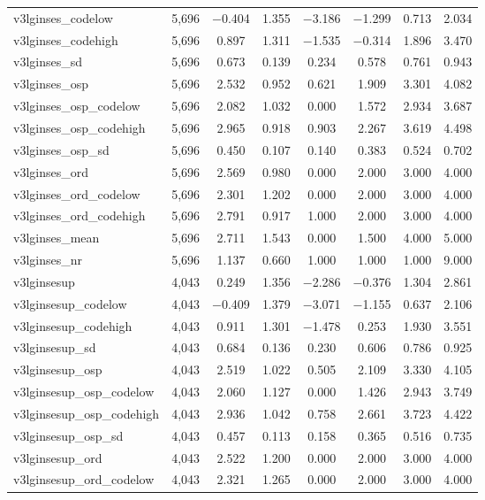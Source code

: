 \begin{table}[!htbp]
\begin{tabular}{@{\extracolsep{5pt}}lccccccc}
v3lginses\_codelow & 5,696 & $-$0.404 & 1.355 & $-$3.186 & $-$1.299 & 0.713 & 2.034 \\ 
v3lginses\_codehigh & 5,696 & 0.897 & 1.311 & $-$1.535 & $-$0.314 & 1.896 & 3.470 \\ 
v3lginses\_sd & 5,696 & 0.673 & 0.139 & 0.234 & 0.578 & 0.761 & 0.943 \\ 
v3lginses\_osp & 5,696 & 2.532 & 0.952 & 0.621 & 1.909 & 3.301 & 4.082 \\ 
v3lginses\_osp\_codelow & 5,696 & 2.082 & 1.032 & 0.000 & 1.572 & 2.934 & 3.687 \\ 
v3lginses\_osp\_codehigh & 5,696 & 2.965 & 0.918 & 0.903 & 2.267 & 3.619 & 4.498 \\ 
v3lginses\_osp\_sd & 5,696 & 0.450 & 0.107 & 0.140 & 0.383 & 0.524 & 0.702 \\ 
v3lginses\_ord & 5,696 & 2.569 & 0.980 & 0.000 & 2.000 & 3.000 & 4.000 \\ 
v3lginses\_ord\_codelow & 5,696 & 2.301 & 1.202 & 0.000 & 2.000 & 3.000 & 4.000 \\ 
v3lginses\_ord\_codehigh & 5,696 & 2.791 & 0.917 & 1.000 & 2.000 & 3.000 & 4.000 \\ 
v3lginses\_mean & 5,696 & 2.711 & 1.543 & 0.000 & 1.500 & 4.000 & 5.000 \\ 
v3lginses\_nr & 5,696 & 1.137 & 0.660 & 1.000 & 1.000 & 1.000 & 9.000 \\ 
v3lginsesup & 4,043 & 0.249 & 1.356 & $-$2.286 & $-$0.376 & 1.304 & 2.861 \\ 
v3lginsesup\_codelow & 4,043 & $-$0.409 & 1.379 & $-$3.071 & $-$1.155 & 0.637 & 2.106 \\ 
v3lginsesup\_codehigh & 4,043 & 0.911 & 1.301 & $-$1.478 & 0.253 & 1.930 & 3.551 \\ 
v3lginsesup\_sd & 4,043 & 0.684 & 0.136 & 0.230 & 0.606 & 0.786 & 0.925 \\ 
v3lginsesup\_osp & 4,043 & 2.519 & 1.022 & 0.505 & 2.109 & 3.330 & 4.105 \\ 
v3lginsesup\_osp\_codelow & 4,043 & 2.060 & 1.127 & 0.000 & 1.426 & 2.943 & 3.749 \\ 
v3lginsesup\_osp\_codehigh & 4,043 & 2.936 & 1.042 & 0.758 & 2.661 & 3.723 & 4.422 \\ 
v3lginsesup\_osp\_sd & 4,043 & 0.457 & 0.113 & 0.158 & 0.365 & 0.516 & 0.735 \\ 
v3lginsesup\_ord & 4,043 & 2.522 & 1.200 & 0.000 & 2.000 & 3.000 & 4.000 \\ 
v3lginsesup\_ord\_codelow & 4,043 & 2.321 & 1.265 & 0.000 & 2.000 & 3.000 & 4.000 \\ 

\end{tabular}
\end{table}
